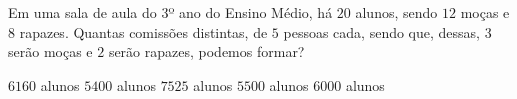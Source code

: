 Em uma sala de aula do 3º ano do Ensino Médio, há $20$ alunos, sendo $12$ moças e $8$ rapazes. Quantas comissões distintas, de $5$ pessoas cada, sendo que, dessas, $3$ serão moças e $2$ serão rapazes, podemos formar?

$6160$ alunos
$5400$ alunos
$7525$ alunos
$5500$ alunos
$6000$ alunos



